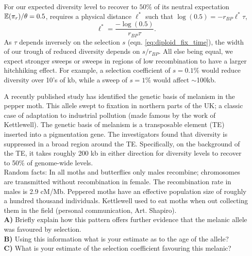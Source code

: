 For our expected diversity level to recover to $50\%$ of
its neutral expectation $\mathbb{E}(\pi_r)/\theta=0.5$, requires a physical
distance $\ell^{*}$ such that $\log(0.5) = -r_{BP} \ell ^*\tau$,  
\begin{equation}
\ell^* = \frac{-\log(0.5)}{r_{BP} \tau }.
\end{equation}
As
$\tau$ depends inversely on the selection $s$ (eqn. \eqref{eq:diploid_fix_time}), the width of our trough of reduced diversity depends on $s/r_{BP}$.
All else being equal, we expect stronger sweeps or sweeps in regions of low
recombination to have a larger hitchhiking effect. For example, a selection coefficient of $s=0.1\%$ would reduce
diversity over 10's of kb, while a sweep of $s=1\%$ would affect
$\sim$100kb.   \\


\begin{question}
A recently published study has identified the genetic basis of
melanism in the pepper moth. This allele swept to fixation in northern
parts of the UK; a classic case of adaptation to industrial pollution
(made famous by the work of Kettlewell). The genetic basis of melanism
is a transposable element (TE) inserted into a pigmentation gene. The
investigators found that diversity is suppressed in a broad region
around the TE. Specifically, on the background of the TE, it takes
roughly 200 kb in either direction for diversity levels to recover to
50\% of genome-wide levels. \\

Random facts: In all moths and butterflies only males recombine;
chromosomes are transmitted without recombination in female. The
recombination rate in males is 2.9 cM/Mb.  Peppered moths have an
effective population size of roughly a hundred thousand
individuals. Kettlewell used to eat moths when out collecting them in
the field (personal communication, Art. Shapiro). \\
{\bf A)} Briefly explain how this pattern offers further evidence that the melanic allele was favoured by selection.\\
{\bf B)} Using this information what is your estimate as to the age of the allele?\\
{\bf C)} What is your estimate of the selection coefficient favouring this melanic?
\end{question}


